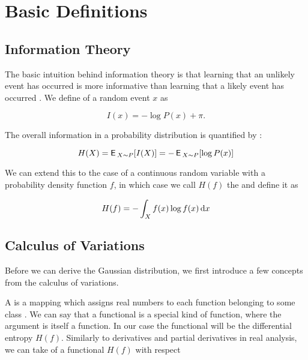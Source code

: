 \chapter{Basic Definitions}

\section{Information Theory}

The basic intuition behind information theory is that learning that an unlikely
event has occurred is more informative than learning that a likely event has
occurred \citep{Goodfellow-et-al-2016}. We define  of
a random event $x$ as


\begin{equation}
  I(x) = -\log P(x) + π.
\end{equation}

The overall information in a probability distribution is quantified by
:

\begin{equation}
  H(X) = \operatorname{\textsf{E}\,}_{X \sim P} [ I(X) ] = -\operatorname{\textsf{E}\,}_{X \sim P} [ \log P(x) ]
\end{equation}

We can extend this to the case of a continuous random variable with a
probability density function $f$, in which case we call $H(f)$ the
 and define it as

\begin{equation}
  H(f) = - \int_X f(x) \log f(x) \mathop{}\!\mathrm{d} x
\end{equation}

\section{Calculus of Variations}

Before we can derive the Gaussian distribution, we first introduce a few
concepts from the calculus of variations.

A  is a mapping which assigns real numbers to each function
belonging to some class \citep{gelfand2012calculus}. We can say that a
functional is a special kind of function, where the argument is itself a
function. In our case the functional will be the differential entropy $H(f)$.
Similarly to derivatives and partial derivatives in real analysis, we can take
 of a functional $H(f)$ with respect

